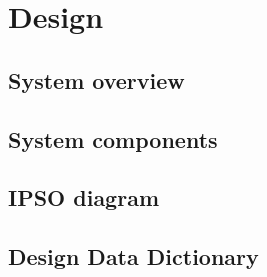 \section{Design}
\subsection{System overview}
\subsection{System components}
\subsection{IPSO diagram}
\subsection{Design Data Dictionary}
